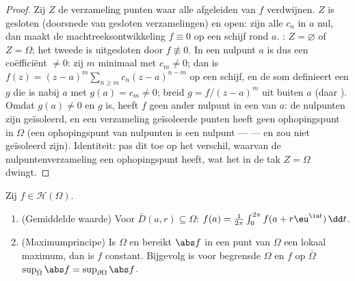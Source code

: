\begin{proof}
Zij $Z$ de verzameling punten waar alle afgeleiden van $f$
verdwijnen. $Z$ is gesloten (doorsnede van gesloten
verzamelingen) en open: zijn alle $c_n$ in $a$ nul, dan maakt de
machtreeksontwikkeling $f \equiv 0$ op een schijf rond $a$.
: $Z = \varnothing$ of $Z = \Omega$; het tweede is
uitgesloten door $f \not\equiv 0$. In een nulpunt $a$ is dus een
coëfficiënt $\neq 0$: zij $m$ minimaal met $c_m \neq 0$; dan is
$f(z) = (z - a)^m\sum_{n\geq m}c_n(z-a)^{n-m}$ op een schijf, en
de som definieert een $g$ die  is nabij $a$ met $g(a) =
c_m \neq 0$; breid $g = f/(z-a)^m$ uit buiten $a$ (daar
). Omdat $g(a) \neq 0$ en $g$  is, heeft $f$ geen
ander nulpunt in een  van $a$: de nulpunten zijn
geïsoleerd, en een verzameling geïsoleerde punten heeft geen
ophopingspunt in $\Omega$ (een ophopingspunt van nulpunten is een
nulpunt ---  --- en zou niet geïsoleerd zijn).
Identiteit: pas dit toe op het verschil, waarvan de
nulpuntenverzameling een ophopingspunt heeft, wat het in de tak
$Z = \Omega$ dwingt.
\end{proof}

\begin{theorem}
\label{thm:b3:holomorphic:maximum}
Zij $f \in \mathcal H(\Omega)$.
\begin{enumerate}
  \item (Gemiddelde waarde) Voor $\bar D(a, r) \subseteq \Omega$:
        $f(a) = \frac1{2\pi}\int_0^{2\pi}f(a + r\eu^{\iu t})\,\dd
        t$.
  \item (Maximumprincipe) Is $\Omega$  en bereikt
        $\abs f$ in een punt van $\Omega$ een lokaal maximum, dan
        is $f$ constant. Bijgevolg is voor begrensde $\Omega$ en
        $f$  op $\bar\Omega$ $\sup_{\bar\Omega}\abs f =
        \sup_{\partial\Omega}\abs f$.
\end{enumerate}
\end{theorem}

